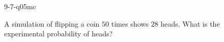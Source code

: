 \begin{practiceQuestion}{9-7-q05}{mc}
\begin{questionText}
A simulation of flipping a coin $50$ times shows $28$ heads. What is the experimental probability of heads?
\end{questionText}
\end{practiceQuestion}
